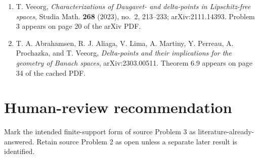 \documentclass[11pt]{article}
\begin{document}
\begin{enumerate}
\item T. Veeorg, \emph{Characterizations of Daugavet- and delta-points in
Lipschitz-free spaces}, Studia Math. \textbf{268} (2023), no.~2, 213--233;
arXiv:2111.14393.  Problem 3 appears on page 20 of the arXiv PDF.
\item T. A. Abrahamsen, R. J. Aliaga, V. Lima, A. Martiny, Y. Perreau,
A. Prochazka, and T. Veeorg, \emph{Delta-points and their implications for
the geometry of Banach spaces}, arXiv:2303.00511.  Theorem 6.9 appears on
page 34 of the cached PDF.
\end{enumerate}

\section*{Human-review recommendation}

Mark the intended finite-support form of source Problem 3 as
literature-already-answered.  Retain source Problem 2 as open unless a
separate later result is identified.
\end{document}
